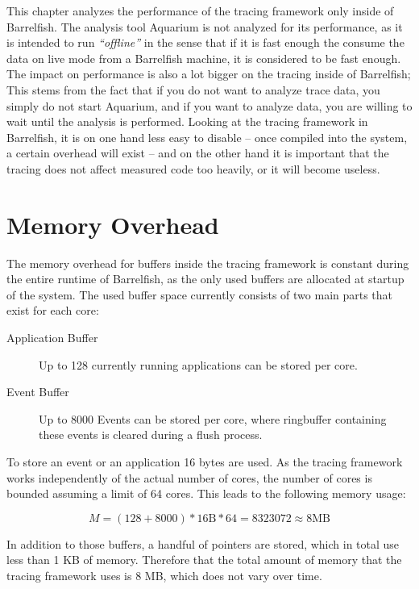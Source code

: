 \documentclass[a4paper,11pt,twoside]{report}
\begin{document}
This chapter analyzes the performance of the tracing framework only inside of
Barrelfish. The analysis tool Aquarium is not analyzed for its performance, as
it is intended to run \emph{``offline''} in the sense that if it is fast enough
the consume the data on live mode from a Barrelfish machine, it is considered to
be fast enough. The impact on performance is also a lot bigger on the tracing
inside of Barrelfish; This stems from the fact that if you do not want to
analyze trace data, you simply do not start Aquarium, and if you want to analyze
data, you are willing to wait until the analysis is performed. Looking at the
tracing framework in Barrelfish, it is on one hand less easy to disable -- once
compiled into the system, a certain overhead will exist -- and on the other hand
it is important that the tracing does not affect measured code too heavily, or
it will become useless.

\section{Memory Overhead}

The memory overhead for buffers inside the tracing framework is constant during
the entire runtime of Barrelfish, as the only used buffers are allocated at
startup of the system. The used buffer space currently consists of two main
parts that exist for each core:

\begin{description}
	\item[Application Buffer] Up to 128 currently running applications can be
		stored per core.
	\item[Event Buffer] Up to 8000 Events can be stored per core, where
		ringbuffer containing these events is cleared during a flush process.
\end{description}

To store an event or an application 16 bytes are used. As the tracing framework
works independently of the actual number of cores, the number of cores is
bounded assuming a limit of 64 cores. This leads to the following memory usage:

\begin{equation}
	M = (128 + 8000) * 16 \textrm{B} * 64 = 8323072 \approx 8 \textrm{MB}
\end{equation}

In addition to those buffers, a handful of pointers are stored, which in total
use less than 1 KB of memory. Therefore that the total amount of memory that the
tracing framework uses is 8 MB, which does not vary over time.
\end{document}
